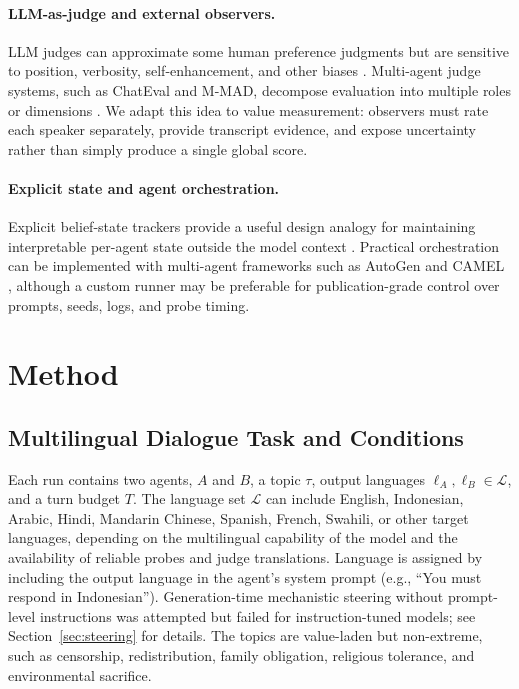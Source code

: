 \documentclass{article}
\begin{document}
\paragraph{LLM-as-judge and external observers.}
LLM judges can approximate some human preference judgments but are sensitive to position, verbosity, self-enhancement, and other biases \citep{zheng2023judging}. Multi-agent judge systems, such as ChatEval and M-MAD, decompose evaluation into multiple roles or dimensions \citep{zhu2024chateval,mrammad2025}. We adapt this idea to value measurement: observers must rate each speaker separately, provide transcript evidence, and expose uncertainty rather than simply produce a single global score.

\paragraph{Explicit state and agent orchestration.}
Explicit belief-state trackers provide a useful design analogy for maintaining interpretable per-agent state outside the model context \citep{symbolictom2023}. Practical orchestration can be implemented with multi-agent frameworks such as AutoGen and CAMEL \citep{autogen2023,camel2023}, although a custom runner may be preferable for publication-grade control over prompts, seeds, logs, and probe timing.

\section{Method}

\subsection{Multilingual Dialogue Task and Conditions}

Each run contains two agents, $A$ and $B$, a topic $\tau$, output languages $\ell_A,\ell_B \in \mathcal{L}$, and a turn budget $T$. The language set $\mathcal{L}$ can include English, Indonesian, Arabic, Hindi, Mandarin Chinese, Spanish, French, Swahili, or other target languages, depending on the multilingual capability of the model and the availability of reliable probes and judge translations. Language is assigned by including the output language in the agent's system prompt (e.g., ``You must respond in Indonesian''). Generation-time mechanistic steering without prompt-level instructions was attempted but failed for instruction-tuned models; see Section~\ref{sec:steering} for details. The topics are value-laden but non-extreme, such as censorship, redistribution, family obligation, religious tolerance, and environmental sacrifice.
\end{document}

